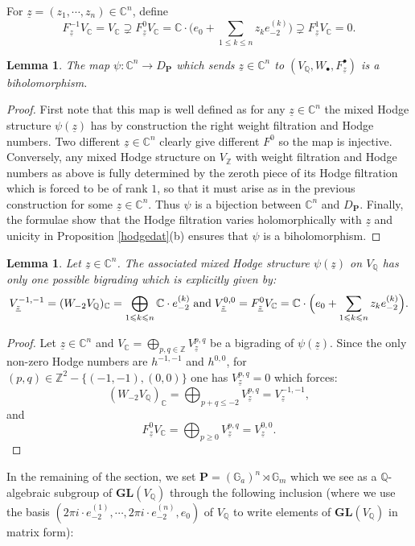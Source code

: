 \documentclass[10pt]{article}
\numberwithin{equation}{subsection}
\theoremstyle{plain}
\newtheorem{lemma}[theorem]{Lemma}
\theoremstyle{definition}
\theoremstyle{remark}
\newcommand{\Z}{\mathbb Z}
\newcommand{\Q}{\mathbb Q}
\newcommand{\C}{\mathbb C}
\newcommand{\mult}{\mathbb G}
\newcommand{\pp}{\mathbf P}
\newcommand{\bul}{\bullet}
\newcommand{\gl}{\mathbf{GL}}
\newcommand{\ee}{e_{-2}}
\newcommand{\zz}{\underline{z}}
\begin{document}
For $\zz = (z_1, \cdots, z_n) \in \C^n$, define
\[
F_{\zz}^{-1} V_\C = V_\C \supsetneq F_{\zz}^0V_\C = \C\cdot \Big(e_0 + \sum_{1 \leqslant k \leqslant n} z_k e^{(k)}_{-2}\Big) \supsetneq F_{\zz}^1V_\C = 0.
\]
\begin{lemma}
The map $\psi : \C^n \rightarrow D_\pp$ which sends $\zz \in \C^n$ to $(V_\Q, W_\bul, F_{\zz}^\bul)$ is a biholomorphism. 
\end{lemma}
\begin{proof}
First note that this map is well defined as for any $\zz \in \C^n$ the mixed Hodge structure $\psi(\zz)$ has by construction the right weight filtration and Hodge numbers. Two different $\zz \in \C^n$ clearly give different $F^0$ so the map is injective. Conversely, any mixed Hodge structure on $V_\Z$ with weight filtration and Hodge numbers as above is fully determined by the zeroth piece of its Hodge filtration which is forced to be of rank $1$, so that it must arise as in the previous construction for some $\zz \in \C^n$. Thus $\psi$ is a bijection between $\C^n$ and $D_\pp$. Finally, the formulae show that the Hodge filtration varies holomorphically with $\zz$ and unicity in Proposition \ref{hodgedat}(b) ensures that $\psi$ is a biholomorphism.
\end{proof}
\begin{lemma}\label{bigradc}
Let $\zz \in \C^n$. The associated mixed Hodge structure $\psi(\zz)$ on $V_\Q$ has only one possible bigrading which is explicitly given by:
\[
V_{\zz}^{-1,-1} = (W_{-2}V_\Q)_\C = \bigoplus_{1 \leqslant k \leqslant n}\C \cdot e^{(k)}_{-2} \hspace{0.1cm} \mathrm{and} \hspace{0.1cm} V_{\zz}^{0,0} = F_{\zz}^{0}V_\C = \C\cdot \Big(e_0 +\sum_{1 \leqslant k \leqslant n} z_k e^{(k)}_{-2}\Big).
\]
\end{lemma}
\begin{proof}
Let $\zz \in \C^n$ and $V_\C = \bigoplus_{p,q \in \Z} V_{\zz}^{p,q}$ be a bigrading of $\psi(\zz)$. Since the only non-zero Hodge numbers are $h^{-1,-1}$ and $h^{0,0}$, for $(p,q)\in \Z^2-\{(-1,-1), (0,0)\}$ one has $V_{\zz}^{p,q} = 0$ which forces:
\[
(W_{-2}V_\Q)_\C = \bigoplus_{p+q \leqslant -2} V_{\zz}^{p,q} = V_{\zz}^{-1,-1},
\]
and
\[
F_{\zz}^0V_\C = \bigoplus_{p\geqslant 0} V_{\zz}^{p,q} = V_{\zz}^{0,0}.
\]
\end{proof}
In the remaining of the section, we set $\pp = (\mult_a)^n \rtimes \mult_m$ which we see as a $\Q$-algebraic subgroup of $\gl(V_\Q)$ through the following inclusion (where we use the basis $(2 \pi i \cdot \ee^{(1)}, \cdots, 2 \pi i \cdot\ee^{(n)}, e_0)$ of $V_\Q$ to write elements of $\gl(V_\Q)$ in matrix form):
\end{document}
